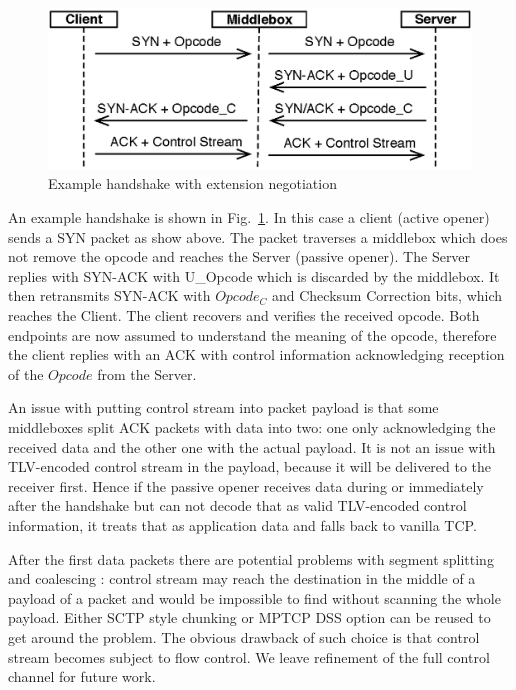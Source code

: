 \documentclass{sig-alternate-10pt}
\begin{document}
\begin{figure}[t!]
\centering
\includegraphics[width=.9\columnwidth]{figs/handshake}
\caption{Example handshake with extension negotiation}
\label{fig:handshake}
\end{figure}

An example handshake is shown in Fig.~\ref{fig:handshake}. In this case a client (active opener) sends a SYN packet as show above. The packet traverses a middlebox which does not remove the opcode and reaches the Server (passive opener). The Server replies with SYN-ACK with U\_Opcode which is discarded by the middlebox. It then retransmits SYN-ACK with $Opcode_C$ and Checksum Correction bits, which reaches the Client. The client recovers and verifies the received opcode. Both endpoints are now assumed to understand the meaning of the opcode, therefore the client replies with an ACK with control information acknowledging reception of the $Opcode$ from the Server.

An issue with putting control stream into packet payload is that some middleboxes split ACK packets with data into two: one only acknowledging the received data and the other one with the actual payload. It is not an issue with TLV-encoded control stream in the payload, because it will be delivered to the receiver first. Hence if the passive opener receives data during or immediately after the handshake but can not decode that as valid TLV-encoded control information, it treats that as application data and falls back to vanilla TCP.

After the first data packets there are potential problems with segment splitting and coalescing : control stream may reach the destination in the middle of a payload of a packet and would be impossible to find without scanning the whole payload. Either SCTP style chunking or MPTCP DSS option can be reused to get around the problem. The obvious drawback of such choice is that control stream becomes subject to flow control. We leave refinement of the full control channel for future work.
\end{document}
